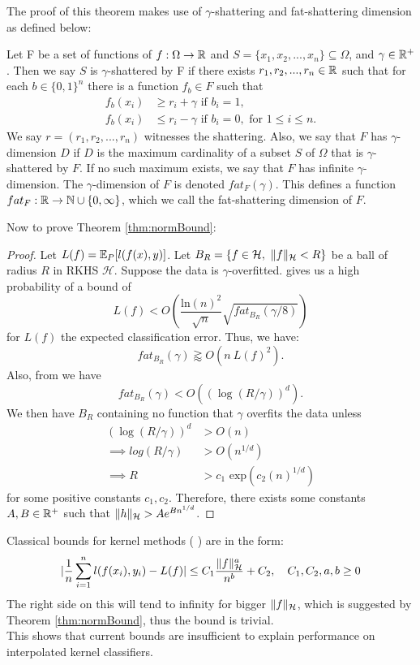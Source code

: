 \documentclass[twoside]{memoir}
\begin{document}
The proof of this theorem makes use of $\gamma$-shattering and fat-shattering dimension as defined below:
\begin{defn}
	Let F be a set of functions of $f: \Omega \rightarrow \mathbb{R}$ and $S = \{x_1, x_2, ..., x_n\} \subseteq \Omega$, and $\gamma \in \mathbb{R}^+$. Then we say $S$ is $\gamma$-shattered by F if there exists $r_1, r_2,..., r_n \in \mathbb{R}$ such that for each $b \in \{0, 1\}^n$ there is a function $f_b \in F$ such that
	\begin{equation*}
	\begin{split}
	f_b(x_i) &\geq r_i + \gamma \text{ if } b_i = 1, \\
	f_b(x_i) &\leq r_i - \gamma \text{ if } b_i = 0, \text{ for } 1 \leq i \leq n.
	\end{split}	
	\end{equation*}
	We say $r = (r_1, r_2,..., r_n)$ witnesses the shattering.
	Also, we say that $F$ has $\gamma$-dimension $D$ if $D$ is the maximum	cardinality of a subset $S$ of $\Omega$ that is $\gamma$-shattered by $F$. If no such maximum exists, we say that $F$ has infinite $\gamma$-dimension. The $\gamma$-dimension of $F$ is denoted $fat_F(\gamma)$. This defines a function $fat_F: \mathbb{R} \rightarrow \mathbb{N} \cup \{0,\infty\}$, which we call the fat-shattering dimension of $F$.
\end{defn}
Now to prove Theorem \ref{thm:normBound}:
\begin{proof}
	Let $L(f) = \mathbb{E}_P[l(f(x), y)]$.
	Let $B_R = \{ f \in \mathcal{H},~ \lVert f\rVert_\mathcal{H} < R \}$ be a ball of radius $R$ in RKHS $\mathcal{H}$. Suppose the data is $\gamma$-overfitted. \cite{LossFATBound} gives us a high probability of a bound of
	\[ L(f) < O(\frac{\text{ln}(n)^2}{\sqrt{n}}\sqrt{fat_{B_R}(\gamma/8)}) \] for $L(f)$ the expected classification error. Thus, we have:
	\[ fat_{B_R}(\gamma) \gtrapprox O(n ~L(f)^2). \]
	Also, from \cite{ApproximationConcentration} we have \[fat_{B_R}(\gamma) < O((\log(R/\gamma))^d).\]
	We then have $B_R$ containing no function that $\gamma$ overfits the data unless
	\begin{equation*}
	\begin{split}
	(\log(R/\gamma))^d &> O(n) \\
	\implies log(R/\gamma) &> O(n^{1/d}) \\
	\implies R &> c_1 \text{ exp}(c_2(n)^{1/d})
	\end{split}
	\end{equation*}
	for some positive constants $c_1, c_2$. Therefore, there exists some constants $A, B \in \mathbb{R}^+$ such that $\lVert h\rVert_{\mathcal{H}} > Ae^{Bn^{1/d}}$. 
\end{proof}
Classical bounds for kernel methods (\cite{UnderstandKernel,steinwartSVM, Rudi_2015} ) are in the form:
\[ \lvert\frac{1}{n} \sum_{i=1}^{n}l(f(x_i),y_i) - L(f)\rvert \leq C_1 \frac{\lVert f\rVert^a_\mathcal{H}}{n^b} + C_2, \hspace{1em} C_1, C_2,a,b \geq 0 \]
The right side on this will tend to infinity for bigger $\lVert f\rVert_\mathcal{H}$, which is suggested by Theorem \ref{thm:normBound}, thus the bound is trivial.\\
This shows that current bounds are insufficient to explain performance on interpolated kernel classifiers.
\end{document}

